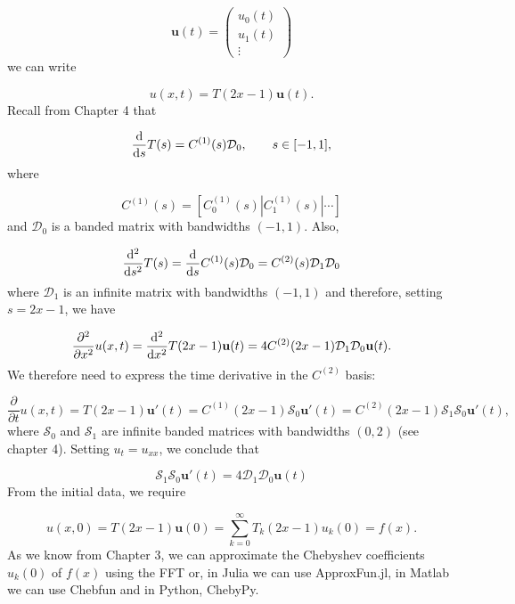 \documentclass[12pt,a4paper]{article}
\begin{document}
\[
\mathbf{u}(t) = \left(
\begin{array}{c}
u_0(t) \\
u_1(t) \\
\vdots
\end{array}
\right)
\]
we can write

\[
u(x,t) = T(2x-1)\mathbf{u}(t).
\]
Recall from Chapter 4 that

\[
\frac{{\rm d}}{{\rm d}s} T(s) = C^{(1)}(s)\mathcal{D}_0, \qquad s \in [-1, 1],
\]
where

\[
C^{(1)}(s) = \left[C_0^{(1)}(s) | C_1^{(1)}(s) | \cdots \right]
\]
and $\mathcal{D}_0$ is a banded matrix with bandwidths $(-1, 1)$.  Also,

\[
\frac{{\rm d}^2}{{\rm d}s^2} T(s) = \frac{{\rm d}}{{\rm d}s}C^{(1)}(s)\mathcal{D}_0 = C^{(2)}(s)\mathcal{D}_1\mathcal{D}_0
\]
where $\mathcal{D}_1$ is an infinite matrix with bandwidths $(-1, 1)$ and therefore, setting $s = 2x -1$, we have

\[
\frac{\partial^2}{\partial x^2} u(x,t) = \frac{{\rm d}^2}{{\rm d}x^2} T(2x-1)\mathbf{u}(t) = 4C^{(2)}(2x-1)\mathcal{D}_1\mathcal{D}_0 \mathbf{u}(t).
\]
We therefore need to express the time derivative in the $C^{(2)}$ basis:

\[
\frac{\partial}{\partial t} u(x,t) = T(2x-1)\mathbf{u}'(t) = C^{(1)}(2x-1)\mathcal{S}_0\mathbf{u}'(t)  = C^{(2)}(2x-1)\mathcal{S}_1\mathcal{S}_0\mathbf{u}'(t),
\]
where $\mathcal{S}_0$ and $\mathcal{S}_1$ are infinite banded matrices with bandwidths $(0, 2)$ (see chapter 4).  Setting $u_t=u_{xx}$, we conclude that

\[
\mathcal{S}_1\mathcal{S}_0\mathbf{u}'(t) = 4\mathcal{D}_1\mathcal{D}_0 \mathbf{u}(t)
\]
From the initial data, we require

\[
u(x,0) = T(2x-1)\mathbf{u}(0) = \sum_{k=0}^{\infty}T_k(2x-1)u_k(0) = f(x).
\]
As we know from Chapter 3, we can approximate the Chebyshev coefficients $u_k(0)$ of $f(x)$ using the FFT or, in Julia we can use ApproxFun.jl, in Matlab we can use Chebfun and in Python, ChebyPy.
\end{document}
